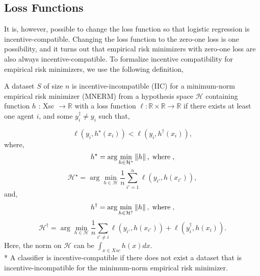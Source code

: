 \documentclass{article}
\begin{document}
\subsection{Loss Functions}
It is, however, possible to change the loss function so that logistic regression is incentive-compatible. Changing the loss function to the zero-one loss is one possibility, and it turns out that empirical risk minimizers with zero-one loss are also always incentive-compatible.
\newline \newline
To formalize incentive compatibility for empirical risk minimizers, we use the following definition,
\begin{df} \label{df:icerm} 
A dataset $S $ of size $n $ is incentive-incompatible (IIC) for a minimum-norm empirical risk minimizer (MNERM) from a hypothesis space $\mathcal{H}$ containing function $h $ : Xsc $\to  \mathbb{R}$ with a loss function $\ell : \mathbb{R} \times \mathbb{R} \to  \mathbb{R}$ if there exists at least one agent $i $, and some $y^{\dagger}_{i} \neq  y_{i}$ such that,
\end{df}
\begin{equation} 
\ell\left(y_{i}, h^\star \left(x_{i}\right)\right) < \ell\left(y_{i} , h^{\dagger}\left(x_{i}\right)\right),
\end{equation}
where,
\begin{equation} 
h^\star  = \arg\displaystyle\min_{h \in \mathcal{H}^\star } \left\|h\right\|, \text{\;where\;} ,
\end{equation}
\begin{equation} 
\mathcal{H}^\star  = \arg\displaystyle\min_{h \in \mathcal{H}} \dfrac{1}{n} \displaystyle\sum_{i' = 1}^{n} \ell\left(y_{i'}, h\left(x_{i'}\right)\right),
\end{equation}
and,
\begin{equation} 
h^{\dagger} = \arg\displaystyle\min_{h \in \mathcal{H}^{\dagger}} \left\|h\right\|, \text{\;where\;} ,
\end{equation}
\begin{equation} 
\mathcal{H}^{\dagger} = \arg\displaystyle\min_{h \in \mathcal{H}} \dfrac{1}{n} \displaystyle\sum_{i' \neq  i} \ell\left(y_{i'}, h\left(x_{i'}\right)\right) + \ell\left(y^{\dagger}_{i}, h\left(x_{i}\right)\right).
\end{equation}
Here, the norm on $\mathcal{H}$ can be $\displaystyle\int_{x \in Xsc} h\left(x\right) d x. $
\\* A classifier is incentive-compatible if there does not exist a dataset that is incentive-incompatible for the minimum-norm empirical risk minimizer.
\end{document}
